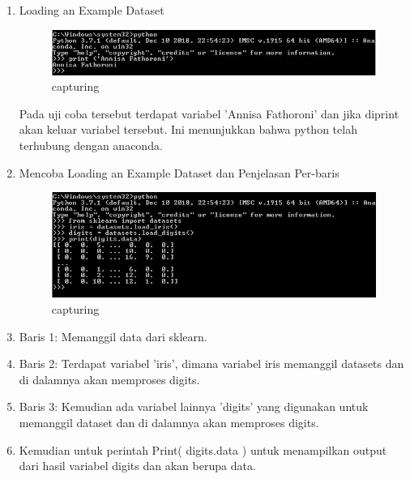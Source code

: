 \begin{enumerate}
\item Loading an Example Dataset
\begin{figure}[ht]
\centering
\includegraphics[scale=0.5]{figures/Capture2.jpg}
\caption{capturing}
\label{uji coba}
\end{figure}

Pada uji coba tersebut terdapat variabel 'Annisa Fathoroni' dan jika diprint akan keluar variabel tersebut.
Ini menunjukkan bahwa python telah terhubung dengan anaconda.

\item Mencoba Loading an Example Dataset dan Penjelasan Per-baris

\begin{figure}[ht]
\centering
\includegraphics[scale=0.5]{figures/Capture.jpg}
\caption{capturing}
\label{loading an example dataset}
\end{figure}

\item Baris 1:
Memanggil data dari sklearn.
\item Baris 2:
Terdapat variabel 'iris', dimana variabel iris memanggil datasets dan di dalamnya akan memproses digits.
\item Baris 3:
Kemudian ada variabel lainnya 'digits' yang digunakan untuk memanggil dataset dan di dalamnya akan memproses digits.
\item Kemudian untuk perintah Print( digits.data ) untuk menampilkan output dari hasil variabel digits dan akan berupa data.

\end{enumerate}

